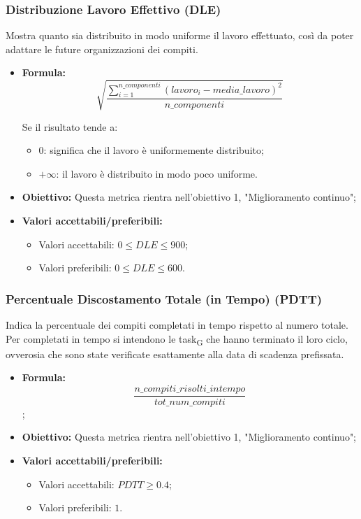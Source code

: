 \subsubsection{Distribuzione Lavoro Effettivo (DLE)}
Mostra quanto sia distribuito in modo uniforme il lavoro effettuato, così da poter adattare le future organizzazioni dei compiti.
\begin{itemize}
	\item \textbf{Formula:}\[\sqrt{\frac{\sum_{i=1}^{n\_componenti}(lavoro_i-media\_lavoro)^2}{n\_componenti}}\]
	
	Se il risultato tende a:
	\begin{itemize}
		\item 0: significa che il lavoro è uniformemente distribuito;
		\item $+\infty$: il lavoro è distribuito in modo poco uniforme.
	\end{itemize}
	\item \textbf{Obiettivo:} Questa metrica rientra nell'obiettivo 1, "Miglioramento continuo";
	\item \textbf{Valori accettabili/preferibili: }
	\begin{itemize}
		\item Valori accettabili: $0 \leq DLE \leq 900$;
		\item Valori preferibili: $0 \leq DLE \leq 600$.
	\end{itemize}
\end{itemize}

\subsubsection{Percentuale Discostamento Totale (in Tempo) (PDTT)}
Indica la percentuale dei compiti completati in tempo rispetto al numero totale. Per completati in tempo si intendono le task\textsubscript{G} che hanno terminato il loro ciclo, ovverosia che sono state verificate esattamente alla data di scadenza prefissata.
\begin{itemize}
	\item \textbf{Formula:}\[\frac{n\_compiti\_risolti\_intempo}{tot\_num\_compiti}\];
	\item \textbf{Obiettivo:} Questa metrica rientra nell'obiettivo 1, "Miglioramento continuo";
	\item \textbf{Valori accettabili/preferibili: }
	\begin{itemize}
		\item Valori accettabili: $PDTT \geq 0.4$;
		\item Valori preferibili: $1$.
	\end{itemize}
\end{itemize}


